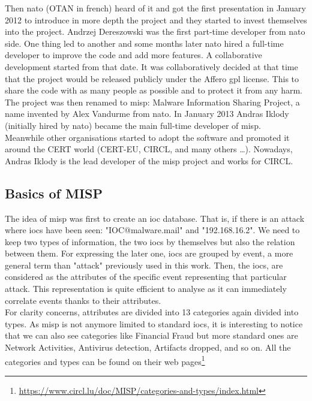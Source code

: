 \documentclass{eplmastersthesis}
\begin{document}
Then \gls{nato} (OTAN in french) heard of it and got the first presentation in January 2012 to introduce in more depth the project and they started to invest themselves into the project. Andrzej Dereszowski was the first part-time developer from  \gls{nato} side.
One thing led to another and some months later  \gls{nato} hired a full-time developer to improve the code and add more features. A collaborative development started from that date. 
It was collaboratively decided at that time that the project would be released publicly under the Affero \gls{gpl} license. This to share the code with as many people as possible and to protect it from any harm.
The project was then renamed to \gls{misp}: Malware Information Sharing Project, a name invented by Alex Vandurme from  \gls{nato}.
In January 2013 Andras Iklody (initially hired by  \gls{nato}) became the main full-time developer of \gls{misp}.\\

Meanwhile other organisations started to adopt the software and promoted it around the CERT world (CERT-EU, CIRCL, and many others …). Nowadays, Andras Iklody is the lead developer of the \gls{misp} project and works for CIRCL.\\

\subsection{Basics of MISP}
The idea of \gls{misp} was first to create an \gls{ioc} database. That is, if there is an attack where \gls{ioc}s have been seen: "IOC@malware.mail" and "192.168.16.2". We need to keep two types of information, the two \gls{ioc}s by themselves but also the relation between them. For expressing the later one, \gls{ioc}s are grouped by event, a more general term than "attack" previously used in this work.  Then, the \gls{ioc}s, are considered as the attributes of the specific event representing that particular attack.
This representation is quite efficient to analyse as it can immediately correlate events thanks to their attributes.\\

For clarity concerns, attributes are divided into 13 categories again divided into types. As \gls{misp} is not anymore limited to standard \gls{ioc}s, it is interesting to notice that we can also see categories like Financial Fraud but more standard ones are Network Activities, Antivirus detection, Artifacts dropped, and so on.
All the categories and types can be found on their web pages\footnote {\url{https://www.circl.lu/doc/MISP/categories-and-types/index.html}}
\end{document}

